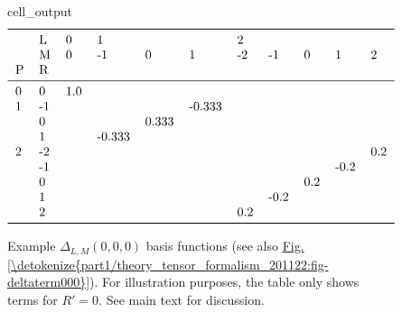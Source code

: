 \documentclass[letterpaper,table,10pt,english]{jupyterBook}
\begin{document}
\begin{figure}[htbp]
\centering
\capstart
\begin{sphinxVerbatimOutput}

\begin{sphinxuseclass}{cell_output}\begin{equation*}
\begin{split}\begin{tabular}{lllllllllll}
\toprule
  & L &    0 & \multicolumn{3}{l}{1} & \multicolumn{5}{l}{2} \\
  & M &    0 &     -1 &      0 &      1 &   -2 &   -1 &    0 &    1 &    2 \\
P & R &      &        &        &        &      &      &      &      &      \\
\midrule
0 &  0 &  1.0 &        &        &        &      &      &      &      &      \\
1 & -1 &      &        &        & -0.333 &      &      &      &      &      \\
  &  0 &      &        &  0.333 &        &      &      &      &      &      \\
  &  1 &      & -0.333 &        &        &      &      &      &      &      \\
2 & -2 &      &        &        &        &      &      &      &      &  0.2 \\
  & -1 &      &        &        &        &      &      &      & -0.2 &      \\
  &  0 &      &        &        &        &      &      &  0.2 &      &      \\
  &  1 &      &        &        &        &      & -0.2 &      &      &      \\
  &  2 &      &        &        &        &  0.2 &      &      &      &      \\
\bottomrule
\end{tabular}\end{split}
\end{equation*}
\end{sphinxuseclass}\end{sphinxVerbatimOutput}
\caption{Example \(\Delta_{L,M}(0,0,0)\) basis functions (see also \hyperref[\detokenize{part1/theory_tensor_formalism_201122:fig-deltaterm000}]{Fig.\@ \ref{\detokenize{part1/theory_tensor_formalism_201122:fig-deltaterm000}}}). For illustration purposes, the table only shows terms for \(R'=0\). See main text for discussion.}\label{\detokenize{part1/theory_tensor_formalism_201122:tab-deltaterm000}}\end{figure}
\end{document}
